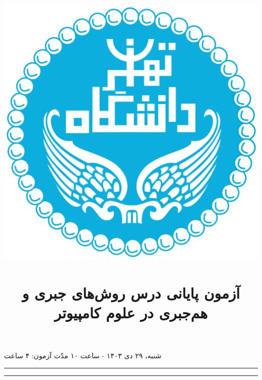 \title{\vspace*{-2cm}\includegraphics[scale=0.1]{res/logo.png}\\ \vspace*{-5mm}{\small دانشکدهٔ ریاضی، آمار و علوم کامپیوتر}\\آزمون پایانی درس روش‌های جبری و هم‌جبری در علوم کامپیوتر}
\author{}
\date{}

\maketitle
\vspace{-28mm}
\begin{center} شنبه، ۲۹ دی ۱۴۰۳ - ساعت ۱۰ \quad مدّت آزمون: ۴ ساعت \end{center}
\vspace{4mm}
\hrule
\hrule